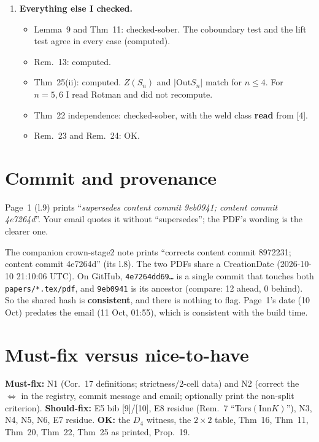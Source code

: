 \documentclass[11pt]{article}
\newcommand{\Inn}{\mathrm{Inn}}
\newcommand{\Out}{\mathrm{Out}}
\newcommand{\vd}[1]{\fbox{\textbf{#1}}}
\begin{document}
\begin{enumerate}[label=\textbf{N\arabic*},leftmargin=*]
There is also a stronger true statement worth adding, checked-sober. $[g]=\rho^*[\star]$ is pulled
back along $|N(C)|\to B\Inn K$, which factors through $B\pi_1|N(C)|$. So $[g]$ lies in the image of
$H^2(\pi_1;Z)$, and $[g]=0$ whenever $\pi_1|N(C)|$ is free, e.g.\ trivial. That covers the $S^2$ poset
above, where $H^2\neq0$ but $[g]=0$. ``Degree-genuineness'' is really about $\pi_1$.

\item \vd{OK} \textbf{Everything else I checked.}
\begin{itemize}[leftmargin=1.2em]
\item Lemma~9 and Thm~11: checked-sober. The coboundary test and the lift test agree in every case
(computed).
\item Rem.~13: computed.
\item Thm~25(ii): computed. $Z(S_n)$ and $|\Out S_n|$ match for $n\le4$. For $n=5,6$ I read Rotman
and did not recompute.
\item Thm~22 independence: checked-sober, with the weld class \textbf{read} from [4].
\item Rem.~23 and Rem.~24: OK.
\end{itemize}
\end{enumerate}

\section{Commit and provenance}
Page~1 (l.9) prints ``\emph{supersedes content commit 9eb0941; content commit 4e7264d}''. Your
email quotes it without ``supersedes''; the PDF's wording is the clearer one.

The companion crown-stage2 note prints ``corrects content commit 8972231; content commit 4e7264d''
(its l.8). The two PDFs share a CreationDate (2026-10-10 21:10:06 UTC). On GitHub,
\texttt{4e7264dd69\dots} is a single commit that touches both \texttt{papers/*.tex/pdf}, and
\texttt{9eb0941} is its ancestor (compare: 12 ahead, 0 behind). So the shared hash is
\textbf{consistent}, and there is nothing to flag. Page~1's date (10 Oct) predates the email
(11 Oct, 01:55), which is consistent with the build time.

\section*{Must-fix versus nice-to-have}
\textbf{Must-fix:} N1 (Cor.~17 definitions; strictness/2-cell data) and N2 (correct the $\iff$ in
the registry, commit message and email; optionally print the non-split criterion).
\textbf{Should-fix:} E5 bib [9]/[10], E8 residue (Rem.~7 ``Tors$(\Inn K)$''), N3, N4, N5, N6, E7
residue. \textbf{OK:} the $D_4$ witness, the $2\times2$ table, Thm~16, Thm~11, Thm~20, Thm~22,
Thm~25 as printed, Prop.~19.
\end{document}
